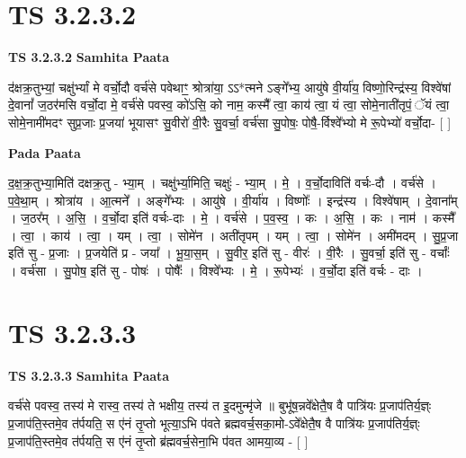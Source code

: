 \documentclass[17pt]{extarticle}
\begin{document}
\section*{ TS 3.2.3.2 }

\textbf{TS 3.2.3.2 } \newline
\textbf{Samhita Paata} \newline

द॑क्षक्र॒तुभ्यां॒ चक्षु॑र्भ्यां मे वर्चो॒दौ वर्च॑से पवेथाꣳ॒॒ श्रोत्रा॑या॒ ऽऽ*त्मने ऽङ्गे᳚भ्य॒ आयु॑षे वी॒र्या॑य॒ विष्णो॒रिन्द्र॑स्य॒ विश्वे॑षां दे॒वानां᳚ ज॒ठर॑मसि वर्चो॒दा मे॒ वर्च॑से पवस्व॒ को॑ऽसि॒ को नाम॒ कस्मै᳚ त्वा॒ काय॑ त्वा॒ यं त्वा॒ सोमे॒नाती॑तृपं॒ ॅयं त्वा॒ सोमे॒नामी॑मदꣳ सुप्र॒जाः प्र॒जया॑ भूयासꣳ सु॒वीरो॑ वी॒रैः सु॒वर्चा॒ वर्च॑सा सु॒पोषः॒ पोषै॒-र्विश्वे᳚भ्यो मे रू॒पेभ्यो॑ वर्चो॒दा- [  ] \newline

\textbf{Pada Paata} \newline

द॒क्ष॒क्र॒तुभ्या॒मिति॑ दक्षक्र॒तु - भ्या॒म् । चक्षु॑र्भ्या॒मिति॒ चक्षुः॑ - भ्या॒म् । मे॒ । व॒र्चो॒दाविति॑ वर्चः-दौ । वर्च॑से । प॒वे॒था॒म् । श्रोत्रा॑य । आ॒त्मने᳚ । अङ्गे᳚भ्यः । आयु॑षे । वी॒र्या॑य । विष्णोः᳚ । इन्द्र॑स्य । विश्वे॑षाम् । दे॒वाना᳚म् । ज॒ठर᳚म् । अ॒सि॒ । व॒र्चो॒दा इति॑ वर्चः-दाः । मे॒ । वर्च॑से । प॒व॒स्व॒ । कः । अ॒सि॒ । कः । नाम॑ । कस्मै᳚ । त्वा॒ । काय॑ । त्वा॒ । यम् । त्वा॒ । सोमे॑न । अती॑तृपम् । यम् । त्वा॒ । सोमे॑न । अमी॑मदम् । सु॒प्र॒जा इति॑ सु - प्र॒जाः । प्र॒जयेति॑ प्र - जया᳚ । भू॒या॒स॒म् । सु॒वीर॒ इति॑ सु - वीरः॑ । वी॒रैः । सु॒वर्चा॒ इति॑ सु - वर्चाः᳚ । वर्च॑सा । सु॒पोष॒ इति॑ सु - पोषः॑ । पोषैः᳚ । विश्वे᳚भ्यः । मे॒ । रू॒पेभ्यः॑ । व॒र्चो॒दा इति॑ वर्चः - दाः ।  \newline




\section*{ TS 3.2.3.3 }

\textbf{TS 3.2.3.3 } \newline
\textbf{Samhita Paata} \newline

वर्च॑से पवस्व॒ तस्य॑ मे रास्व॒ तस्य॑ ते भक्षीय॒ तस्य॑ त इ॒दमुन्मृ॑जे ॥ बुभू॑ष॒न्नवे᳚क्षेतै॒ष वै पात्रि॑यः प्र॒जाप॑तिर्य॒ज्ञ्ः प्र॒जाप॑ति॒स्तमे॒व त॑र्पयति॒ स ए॑नं तृ॒प्तो भूत्या॒ऽभि प॑वते ब्रह्मवर्च॒सका॒मो-ऽवे᳚क्षेतै॒ष वै पात्रि॑यः प्र॒जाप॑तिर्य॒ज्ञ्ः प्र॒जाप॑ति॒स्तमे॒व त॑र्पयति॒ स ए॑नं तृ॒प्तो ब्र॑ह्मवर्च॒सेना॒भि प॑वत आमया॒व्य - [  ] \newline
\end{document}
